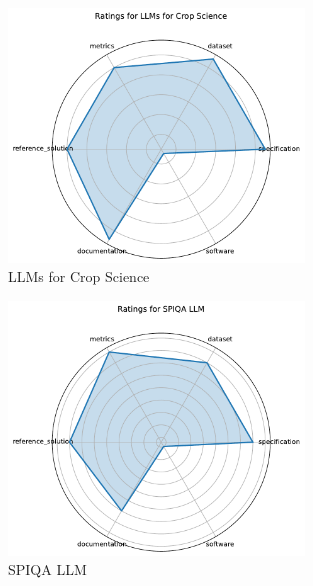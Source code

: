 \documentclass{article}
\begin{document}
\begin{figure}[h!]
  \centering
  \includegraphics[width=0.7\textwidth]{LLMs for Crop Science_radar.pdf}
  \caption{LLMs for Crop Science}
\end{figure}

\begin{figure}[h!]
  \centering
  \includegraphics[width=0.7\textwidth]{SPIQA LLM_radar.pdf}
  \caption{SPIQA LLM}
\end{figure}
\end{document}
